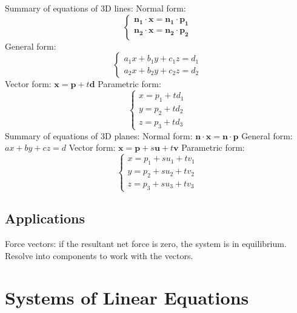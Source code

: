 \documentclass{article}
\begin{document}
\begin{outline}
            \1 Summary of equations of 3D lines:
                \2 Normal form: \[\begin{cases}
                    \mathbf{n_1\cdot x=n_1\cdot p_1} \\
                    \mathbf{n_2\cdot x=n_2\cdot p_2}
                \end{cases}\]
                \2 General form: \[\begin{cases}
                    a_1x+b_1y+c_1z=d_1\\
                    a_2x+b_2y+c_2z=d_2
                \end{cases}\]
                \2 Vector form: \(\mathbf{x=p}+t\mathbf d\)
                \2 Parametric form: \[\begin{cases}
                    x=p_1+td_1\\
                    y=p_2+td_2\\
                    z=p_3+td_3
                \end{cases}\]
            \1 Summary of equations of 3D planes: 
                \2 Normal form: \(\mathbf{n\cdot x=n\cdot p}\)
                \2 General form: \(ax+by+cz=d\)
                \2 Vector form: \(\mathbf{x=p}+s\mathbf u+t\mathbf v\)
                \2 Parametric form: \[\begin{cases}
                    x=p_1+su_1+tv_1\\
                    y=p_2+su_2+tv_2\\
                    z=p_3+su_3+tv_3
                \end{cases}\]
        \end{outline}
        \subsection{Applications}
        \begin{outline}
            \1 Force vectors: if the resultant net force is zero, the system is in equilibrium. 
            \1 Resolve into components to work with the vectors. 
        \end{outline}
    \section{Systems of Linear Equations} %
\end{document}
